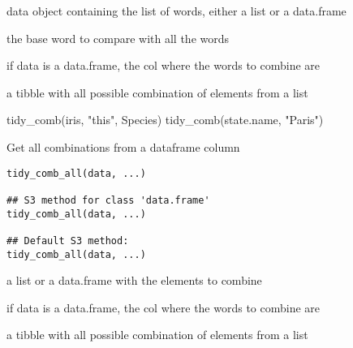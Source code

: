 \documentclass[a4paper]{book}
\begin{document}
%
\begin{Arguments}
\begin{ldescription}
\item[\code{data}] data object containing the list of words, either a list or a data.frame

\item[\code{base}] the base word to compare with all the words

\item[\code{...}] if data is a data.frame, the col where the words to combine are
\end{ldescription}
\end{Arguments}
%
\begin{Value}
a tibble with all possible combination of elements from a list
\end{Value}
%
\begin{Examples}
\begin{ExampleCode}
tidy_comb(iris, "this", Species)
tidy_comb(state.name, "Paris")
\end{ExampleCode}
\end{Examples}
%
\begin{Description}\relax
Get all combinations from a dataframe column
\end{Description}
%
\begin{Usage}
\begin{verbatim}
tidy_comb_all(data, ...)

## S3 method for class 'data.frame'
tidy_comb_all(data, ...)

## Default S3 method:
tidy_comb_all(data, ...)
\end{verbatim}
\end{Usage}
%
\begin{Arguments}
\begin{ldescription}
\item[\code{data}] a list or a data.frame with the elements to combine

\item[\code{...}] if data is a data.frame, the col where the words to combine are
\end{ldescription}
\end{Arguments}
%
\begin{Value}
a tibble with all possible combination of elements from a list
\end{Value}
\end{document}
